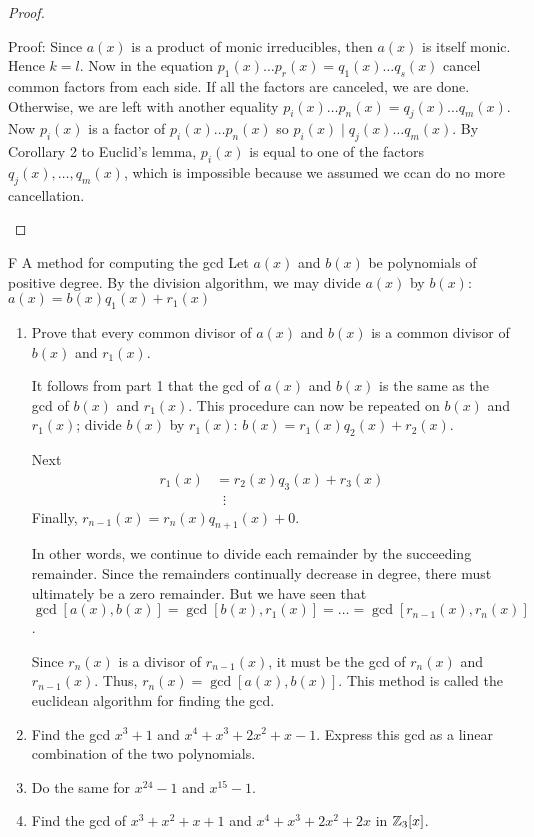 \begin{proof}
\begin{enumerate}
     Proof: Since $a(x)$ is a product of monic irreducibles, then $a(x)$ is itself monic. Hence $k=l$. Now in the equation $p_1(x)\dots p_r(x)=q_1(x)\dots q_s(x)$ cancel common factors from each side. If all the factors are canceled, we are done. Otherwise, we are left with another equality $p_i(x)\dots p_n(x)=q_j(x)\dots q_m(x)$. Now $p_i(x)$ is a factor of $p_i(x)\dots p_n(x)$ so $p_i(x)\mid q_j(x)\dots q_m(x)$. By Corollary 2 to Euclid's lemma, $p_i(x)$ is equal to one of the factors $q_j(x),\dots,q_m(x)$, which is impossible because we assumed we ccan do no more cancellation.
 \end{enumerate}
\end{proof}

\begin{exercise}{F A method for computing the gcd}
Let $a(x)$ and $b(x)$ be polynomials of positive degree. By the division algorithm, we may divide $a(x)$ by $b(x)$: $a(x)=b(x)q_1(x)+r_1(x)$
\begin{enumerate}
    \item Prove that every common divisor of $a(x)$ and $b(x)$ is a common divisor of $b(x)$ and $r_1(x)$.

    It follows from part 1 that the gcd of $a(x)$ and $b(x)$ is the same as the gcd of $b(x)$ and $r_1(x)$. This procedure can now be repeated on $b(x)$ and $r_1(x)$; divide $b(x)$ by $r_1(x)$: $b(x)=r_1(x)q_2(x)+r_2(x)$.

    Next
    \begin{align*}
        r_1(x) &= r_2(x)q_3(x)+r_3(x)\\
        &\;\;\vdots
    \end{align*}
    Finally, $r_{n-1}(x)=r_n(x)q_{n+1}(x)+0$.

    In other words, we continue to divide each remainder by the succeeding remainder. Since the remainders continually decrease in degree, there must ultimately be a zero remainder. But we have seen that $\gcd[a(x),b(x)]=\gcd[b(x),r_1(x)]=\dots=\gcd[r_{n-1}(x),r_n(x)]$. 
    
    Since $r_n(x)$ is a divisor of $r_{n-1}(x)$, it must be the gcd of $r_n(x)$ and $r_{n-1}(x)$. Thus, $r_n(x)=\gcd[a(x), b(x)]$. This method is called the euclidean algorithm for finding the gcd.
    \item Find the gcd $x^3+1$ and $x^4+x^3+2x^2+x-1$. Express this gcd as a linear combination of the two polynomials.
    \item Do the same for $x^{24}-1$ and $x^{15}-1$.
    \item Find the gcd of $x^3+x^2+x+1$ and $x^4+x^3+2x^2+2x$ in $\mathbb{Z}_3[x]$.
\end{enumerate}
\end{exercise}
